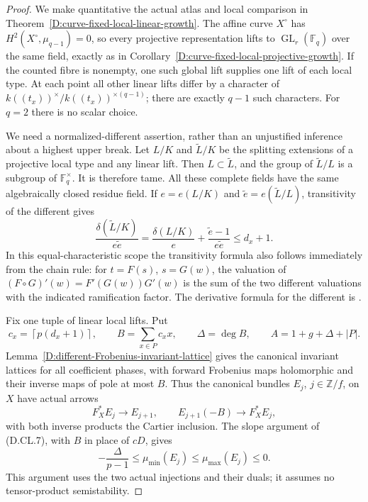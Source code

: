 \begin{proof}
We make quantitative the actual atlas and local comparison
in Theorem~\ref{D:curve-fixed-local-linear-growth}.
The affine curve \(X^\circ\) has
\(H^2(X^\circ,\mu_{q-1})=0\), so every projective
representation lifts to \(\operatorname{GL}_r(\mathbb F_q)\)
over the same field, exactly as in
Corollary~\ref{D:curve-fixed-local-projective-growth}.
If the counted fibre is nonempty, one such global lift
supplies one lift of each local type. At each point all
other linear lifts differ by a character of
\(k((t_x))^\times/k((t_x))^{\times(q-1)}\); there are
exactly \(q-1\) such characters. For \(q=2\) there is no
scalar choice.

We need a normalized-different assertion, rather than an
unjustified inference about a highest upper break.
Let \(L/K\) and \(\widetilde L/K\) be the splitting
extensions of a projective local type and any linear lift.
Then \(L\subset\widetilde L\), and the group of
\(\widetilde L/L\) is a subgroup of
\(\mathbb F_q^\times\). It is therefore tame.
All these complete fields have the same algebraically
closed residue field. If \(e=e(L/K)\) and
\(\widetilde e=e(\widetilde L/L)\), transitivity of the
different gives
\[
 \frac{\delta(\widetilde L/K)}{e\widetilde e}
  =\frac{\delta(L/K)}e+
       \frac{\widetilde e-1}{e\widetilde e}
  \le d_x+1.                                           \tag{D.GH.2}
\]
In this equal-characteristic scope the transitivity formula
also follows immediately from the chain rule: for
\(t=F(s)\), \(s=G(w)\), the valuation of
\((F\circ G)'(w)=F'(G(w))G'(w)\) is the sum of the
two different valuations with the indicated ramification
factor. The derivative formula for the different is
\citet[Lemmas 49.12.1--3 and Example 49.12.5,
Tag 0BWB]{StacksDifferentLatticeB}.

Fix one tuple of linear local lifts. Put
\[
 c_x=\left\lceil p(d_x+1)\right\rceil,\qquad
 B=\sum_{x\in P}c_xx,\qquad
 \Delta=\deg B,\qquad
 A=1+g+\Delta+|P| .
                                                        \tag{D.GH.3}
\]
Lemma~\ref{D:different-Frobenius-invariant-lattice}
gives the canonical invariant lattices for all coefficient
phases, with forward Frobenius maps holomorphic and their
inverse maps of pole at most \(B\).
Thus the canonical bundles \(E_j\), \(j\in\mathbb Z/f\),
on \(X\) have actual arrows
\[
 F_X^*E_j\longrightarrow E_{j+1},
 \qquad E_{j+1}(-B)\longrightarrow F_X^*E_j,
                                                        \tag{D.GH.4}
\]
with both inverse products the Cartier inclusion.
The slope argument of (D.CL.7), with \(B\) in place of
\(cD\), gives
\[
       -\frac{\Delta}{p-1}\le\mu_{\min}(E_j)
                  \le\mu_{\max}(E_j)\le0.               \tag{D.GH.5}
\]
This argument uses the two actual injections and their
duals; it assumes no tensor-product semistability.


\end{proof}

